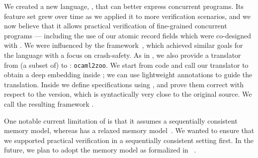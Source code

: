 We created a new \Iris language, \ZooLang, that can better express concurrent \OCaml programs.
Its feature set grew over time as we applied it to more verification scenarios, and we now believe that it allows practical verification of fine-grained concurrent \OCamlFive programs --- including the use of our atomic record fields which were co-designed with \ZooLang.
We were influenced by the \Perennial framework~\citep*{DBLP:conf/sosp/ChajedTKZ19}, which achieved similar goals for the \Go language with a focus on crash-safety.
As in \Perennial, we also provide a translator from (a subset of) \OCaml to \ZooLang: \texttt{ocaml2zoo}.
We start from \OCaml code and call our translator to obtain a deep \ZooLang embedding inside \Rocq; we can use lightweight annotations to guide the translation.
Inside \Rocq we define specifications using \Iris, and prove them correct with respect to the \ZooLang version, which is syntactically very close to the original \OCaml source.
We call the resulting framework \Zoo.

One notable current limitation of \ZooLang is that it assumes a sequentially consistent memory model, whereas \OCamlFive has a relaxed memory model~\citep*{DBLP:conf/pldi/DolanSM18}.
We wanted to ensure that we supported practical verification in a sequentially consistent setting first.
In the future, we plan to adopt the \OCaml memory model as formalized in \Cosmo~\citep*{DBLP:journals/pacmpl/MevelJP20}.


